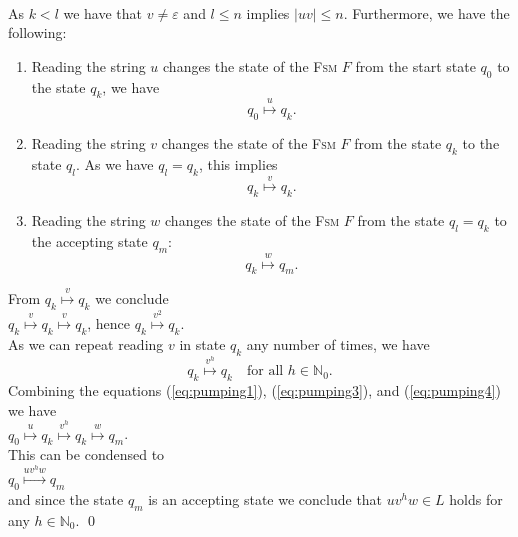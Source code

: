 \\[0.2cm]
As $k < l$ we have that $v \not= \varepsilon$ and $l \leq n$ implies $|uv| \leq n$.
Furthermore, we have the following:
\begin{enumerate}
\item Reading the string $u$ changes the state of the \textsc{Fsm} $F$ from the start state $q_0$ to
      the state $q_k$, we have
      \begin{equation}
        \label{eq:pumping1}
        q_0 \stackrel{u}{\longmapsto} q_k.    
      \end{equation}
\item Reading the string $v$ changes the state of the \textsc{Fsm} $F$ from the state $q_k$ to the
      state $q_l$.  As we have $q_l = q_k$, this implies
      \begin{equation}
        \label{eq:pumping2}
      q_k \stackrel{v}{\longmapsto} q_k.        
      \end{equation}
\item Reading the string $w$ changes the state of the \textsc{Fsm} $F$ from the state  $q_l = q_k$
      to the accepting state $q_m$:
      \begin{equation}
        \label{eq:pumping3}
        q_k \stackrel{w}{\longmapsto} q_m.        
      \end{equation}
\end{enumerate}
From $q_k \stackrel{v}{\longmapsto} q_k$ we conclude
\\[0.2cm]
\hspace*{1.3cm}
$q_k \stackrel{v}{\longmapsto} q_k \stackrel{v}{\longmapsto} q_k$, \quad hence \quad $q_k \stackrel{v^2}{\longmapsto} q_k$.
\\[0.2cm]
As we can repeat reading $v$ in state $q_k$ any number of times, we have
\begin{equation}
  \label{eq:pumping4}
  q_k \stackrel{v^h}{\longmapsto} q_k  \quad \mbox{for all $h \in \mathbb{N}_0$.}
\end{equation}
Combining the equations (\ref{eq:pumping1}), (\ref{eq:pumping3}), and (\ref{eq:pumping4})  we have
\\[0.2cm]
\hspace*{1.3cm}
$q_0 \stackrel{u}{\longmapsto} q_k \stackrel{v^h}{\longmapsto} q_k \stackrel{w}{\longmapsto} q_m$.
\\[0.2cm]
This can be condensed to
\\[0.2cm]
\hspace*{1.3cm}
$q_0 \stackrel{uv^hw}{\longmapsto} q_m$
\\[0.2cm]
and since the state $q_m$ is an accepting state we conclude that $uv^hw \in L$ holds for any $h \in \mathbb{N}_0$. \qed



